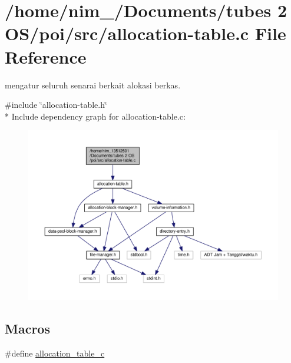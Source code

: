 \hypertarget{allocation-table_8c}{\section{/home/nim\-\_/\-Documents/tubes 2 O\-S/poi/src/allocation-\/table.c File Reference}
\label{allocation-table_8c}
}


mengatur seluruh senarai berkait alokasi berkas.  


{\ttfamily \#include \char`\"{}allocation-\/table.\-h\char`\"{}}\\*
Include dependency graph for allocation-\/table.c\-:\nopagebreak
\begin{figure}[H]
\begin{center}
\leavevmode
\includegraphics[width=350pt]{allocation-table_8c__incl}
\end{center}
\end{figure}
\subsection*{Macros}
\begin{DoxyCompactItemize}
\item 
\#define \hyperlink{allocation-table_8c_afc5318de31f175f755f75812b44051c6}{allocation\-\_\-table\-\_\-c}
\end{DoxyCompactItemize}
